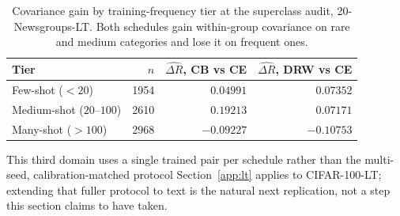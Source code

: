 \begin{table}[t]
\centering
\caption{Covariance gain by training-frequency tier at the superclass audit,
20-Newsgroups-LT. Both schedules gain within-group covariance on rare and medium categories
and lose it on frequent ones.}
\label{tab:textlt-tier}
\begin{tabular}{@{}lrrr@{}}
\toprule
Tier & $n$ & $\widehat{\Delta R}$, CB vs CE & $\widehat{\Delta R}$, DRW vs CE \\
\midrule
Few-shot ($<20$)          & 1954 & $0.04991$  & $0.07352$  \\
Medium-shot ($20$--$100$) & 2610 & $0.19213$  & $0.07171$  \\
Many-shot ($>100$)        & 2968 & $-0.09227$ & $-0.10753$ \\
\bottomrule
\end{tabular}
\end{table}

This third domain uses a single trained pair per schedule rather than the multi-seed,
calibration-matched protocol Section~\ref{app:lt} applies to CIFAR-100-LT; extending
that fuller protocol to text is the natural next replication, not a step this section
claims to have taken.
